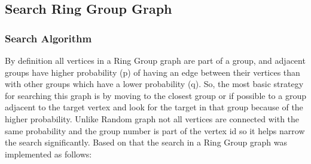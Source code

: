 \documentclass[11pt,a4paper,notitlepage]{article}
\begin{document}
\subsection*{Search Ring Group Graph}
\subsubsection*{Search Algorithm}
By definition all vertices in a Ring Group graph are part of a group, and adjacent groups have higher probability (p) of having an edge between their vertices than with other groups which have a lower probability (q). So, the most basic strategy for searching this graph is by moving to the closest group or if possible to a group adjacent to the target vertex and look for the target in that group because of the higher probability. Unlike Random graph not all vertices are connected with the same probability and the group number is part of the vertex id so it helps narrow the search significantly. Based on that the search in a Ring Group graph was implemented as follows:
\end{document}
